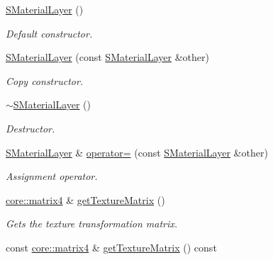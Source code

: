 \begin{DoxyCompactItemize}
\item 
\mbox{\label{classirr_1_1video_1_1SMaterialLayer_aa33412579ecf68093eec0926cfddfcda}} 
\hyperlink{classirr_1_1video_1_1SMaterialLayer_aa33412579ecf68093eec0926cfddfcda}{S\+Material\+Layer} ()
\begin{DoxyCompactList}\small\item\em Default constructor. \end{DoxyCompactList}\item 
\hyperlink{classirr_1_1video_1_1SMaterialLayer_afb8b8d94178e389f8afa1e6190a35f9d}{S\+Material\+Layer} (const \hyperlink{classirr_1_1video_1_1SMaterialLayer}{S\+Material\+Layer} \&other)
\begin{DoxyCompactList}\small\item\em Copy constructor. \end{DoxyCompactList}\item 
\mbox{\label{classirr_1_1video_1_1SMaterialLayer_a3a95dd1993dcc1f2d4bf873602b49b4e}} 
\hyperlink{classirr_1_1video_1_1SMaterialLayer_a3a95dd1993dcc1f2d4bf873602b49b4e}{$\sim$\+S\+Material\+Layer} ()
\begin{DoxyCompactList}\small\item\em Destructor. \end{DoxyCompactList}\item 
\hyperlink{classirr_1_1video_1_1SMaterialLayer}{S\+Material\+Layer} \& \hyperlink{classirr_1_1video_1_1SMaterialLayer_a94f5f3af3cd4ded545779e1942c63734}{operator=} (const \hyperlink{classirr_1_1video_1_1SMaterialLayer}{S\+Material\+Layer} \&other)
\begin{DoxyCompactList}\small\item\em Assignment operator. \end{DoxyCompactList}\item 
\hyperlink{namespaceirr_1_1core_a73fa92e638c5ca97efd72da307cc9b65}{core\+::matrix4} \& \hyperlink{classirr_1_1video_1_1SMaterialLayer_aa8d7c025f5bb282537b8886c340dbe63}{get\+Texture\+Matrix} ()
\begin{DoxyCompactList}\small\item\em Gets the texture transformation matrix. \end{DoxyCompactList}\item 
const \hyperlink{namespaceirr_1_1core_a73fa92e638c5ca97efd72da307cc9b65}{core\+::matrix4} \& \hyperlink{classirr_1_1video_1_1SMaterialLayer_a81072348510d63fcc11134ae7471c5f7}{get\+Texture\+Matrix} () const

\end{DoxyCompactItemize}
